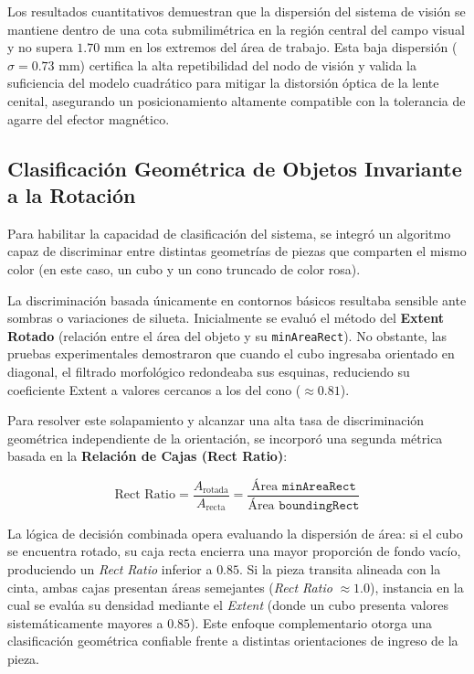 \documentclass[12pt, a4paper]{report}
\begin{document}
Los resultados cuantitativos demuestran que la dispersión del sistema de visión se mantiene dentro de una cota submilimétrica en la región central del campo visual y no supera $1.70\text{ mm}$ en los extremos del área de trabajo. Esta baja dispersión ($\sigma = 0.73\text{ mm}$) certifica la alta repetibilidad del nodo de visión y valida la suficiencia del modelo cuadrático para mitigar la distorsión óptica de la lente cenital, asegurando un posicionamiento altamente compatible con la tolerancia de agarre del efector magnético.

\subsection{Clasificación Geométrica de Objetos Invariante a la Rotación}
Para habilitar la capacidad de clasificación del sistema, se integró un algoritmo capaz de discriminar entre distintas geometrías de piezas que comparten el mismo color (en este caso, un cubo y un cono truncado de color rosa).

La discriminación basada únicamente en contornos básicos resultaba sensible ante sombras o variaciones de silueta. Inicialmente se evaluó el método del \textbf{Extent Rotado} (relación entre el área del objeto y su \texttt{minAreaRect}). No obstante, las pruebas experimentales demostraron que cuando el cubo ingresaba orientado en diagonal, el filtrado morfológico redondeaba sus esquinas, reduciendo su coeficiente Extent a valores cercanos a los del cono ($\approx 0.81$).

Para resolver este solapamiento y alcanzar una alta tasa de discriminación geométrica independiente de la orientación, se incorporó una segunda métrica basada en la \textbf{Relación de Cajas (Rect Ratio)}:

\begin{equation}
    \text{Rect Ratio} = \frac{A_{\text{rotada}}}{A_{\text{recta}}} = \frac{\text{Área } \texttt{minAreaRect}}{\text{Área } \texttt{boundingRect}}
\end{equation}

La lógica de decisión combinada opera evaluando la dispersión de área: si el cubo se encuentra rotado, su caja recta encierra una mayor proporción de fondo vacío, produciendo un \textit{Rect Ratio} inferior a $0.85$. Si la pieza transita alineada con la cinta, ambas cajas presentan áreas semejantes (\textit{Rect Ratio} $\approx 1.0$), instancia en la cual se evalúa su densidad mediante el \textit{Extent} (donde un cubo presenta valores sistemáticamente mayores a $0.85$). Este enfoque complementario otorga una clasificación geométrica confiable frente a distintas orientaciones de ingreso de la pieza.
\end{document}
